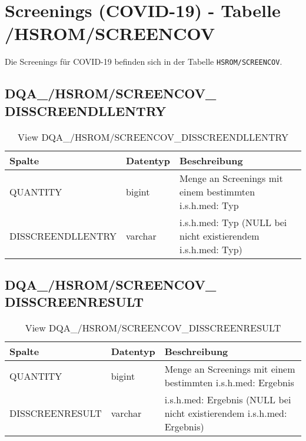 \chapter{Screenings (COVID-19) - Tabelle /HSROM/SCREENCOV}
  Die Screenings für COVID-19 befinden sich in der Tabelle \texttt{HSROM/SCREENCOV}.

  \section{DQA\_/HSROM/SCREENCOV\_ \\ DISSCREENDLLENTRY}

  \begin{table}[ht]
    \centering
    \caption{View DQA\_/HSROM/SCREENCOV\_DISSCREENDLLENTRY}
    \label{tab:dqa/hsrom/screencovdisscreendllentry}
    \begin{tabular}{||l|l|p{10cm}||}
      \hline
      Spalte & Datentyp & Beschreibung \\ [0.5ex] \hline \hline
      QUANTITY & bigint & Menge an Screenings mit einem bestimmten i.s.h.med: Typ \\ \hline
      DISSCREENDLLENTRY & varchar & i.s.h.med: Typ (NULL bei nicht existierendem i.s.h.med: Typ)\\ \hline
    \end{tabular}
  \end{table}

 \clearpage

  \section{DQA\_/HSROM/SCREENCOV\_\\ DISSCREENRESULT}

  \begin{table}[ht]
    \centering
    \caption{View DQA\_/HSROM/SCREENCOV\_DISSCREENRESULT}
    \label{tab:dqa/hsrom/screencovdisscreenresult}
    \begin{tabular}{||l|l|p{10cm}||}
      \hline
      Spalte & Datentyp & Beschreibung \\ [0.5ex] \hline \hline
      QUANTITY & bigint & Menge an Screenings mit einem bestimmten i.s.h.med: Ergebnis \\ \hline
      DISSCREENRESULT & varchar & i.s.h.med: Ergebnis (NULL bei nicht existierendem i.s.h.med: Ergebnis)\\ \hline
    \end{tabular}
  \end{table}
 

